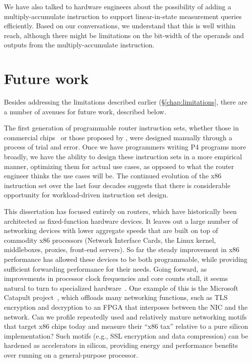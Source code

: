 We have also talked to hardware engineers about the possibility of adding a
multiply-accumulate instruction to support linear-in-state measurement queries
efficiently. Based on our conversations, we understand that this is well within
reach, although there might be limitations on the bit-width of the operands and
outputs from the multiply-accumulate instruction.

\section{Future work}
\label{s:future}

Besides addressing the limitations described earlier (\S\ref{chap:limitations},
there are a number of avenues for future work, described below.

 The first generation of programmable
router instruction sets, whether those in commercial chips~\cite{xpliant,
flexpipe, tofino, rmt} or those proposed by \pktlanguage, were designed
manually through a process of trial and error. Once we have programmers writing
P4 programs more broadly, we have the ability to design these instruction sets
in a more empirical manner, optimizing them for actual use cases, as opposed to
what the router engineer thinks the use cases will be. The continued evolution
of the x86 instruction set over the last four decades suggests that there is
considerable opportunity for workload-driven instruction set design.

 This dissertation has focused entirely on
routers, which have historically been architected as fixed-function hardware
devices. It leaves out a large number of networking devices with lower
aggregate speeds that are built on top of commodity x86 processors (\eg Network
Interface Cards, the Linux kernel, middleboxes, proxies, front-end servers). So
far the steady improvement in x86 performance has allowed these devices to be
both programmable, while providing sufficient forwarding performance for their
needs. Going forward, as improvements in processor clock frequencies and core
counts stall, it seems natural to turn to specialized hardware~\cite{dark_silicon, four_horsemen}.  One example of this is the Microsoft Catapult
project~\cite{catapult}, which offloads many networking functions, such as TLS
encryption and decryption to an FPGA that interposes between the NIC and the
network. Can we profile repeatedly used and relatively mature networking motifs
that target x86 chips today and measure their “x86 tax” relative to a pure
silicon implementation? Such motifs (e.g., SSL encryption and data compression)
can be hardened as accelerators in silicon, providing energy and performance
benefits over running on a general-purpose processor.

